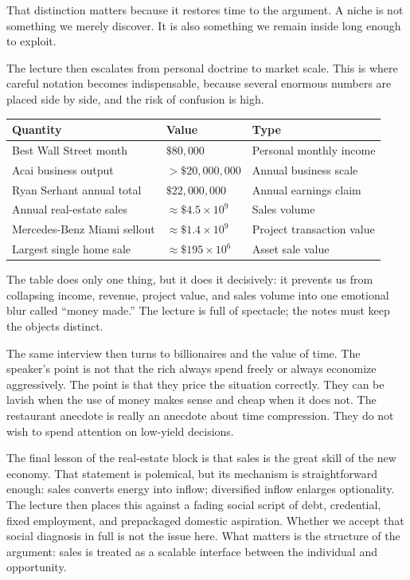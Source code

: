 That distinction matters because it restores time to the argument. A niche is not something we merely discover. It is also something we remain inside long enough to exploit.

The lecture then escalates from personal doctrine to market scale. This is where careful notation becomes indispensable, because several enormous numbers are placed side by side, and the risk of confusion is high.

\begin{table}
\centering
\begin{tabular}{|l|l|l|}
\hline
Quantity & Value & Type \\
\hline
Best Wall Street month & \(\$80{,}000\) & Personal monthly income \\
Acai business output & \(> \$20{,}000{,}000\) & Annual business scale \\
Ryan Serhant annual total & \(\$22{,}000{,}000\) & Annual earnings claim \\
Annual real-estate sales & \(\approx \$4.5 \times 10^9\) & Sales volume \\
Mercedes-Benz Miami sellout & \(\approx \$1.4 \times 10^9\) & Project transaction value \\
Largest single home sale & \(\approx \$195 \times 10^6\) & Asset sale value \\
\hline
\end{tabular}
\end{table}

The table does only one thing, but it does it decisively: it prevents us from collapsing income, revenue, project value, and sales volume into one emotional blur called ``money made.'' The lecture is full of spectacle; the notes must keep the objects distinct.

The same interview then turns to billionaires and the value of time. The speaker's point is not that the rich always spend freely or always economize aggressively. The point is that they price the situation correctly. They can be lavish when the use of money makes sense and cheap when it does not. The restaurant anecdote is really an anecdote about time compression. They do not wish to spend attention on low-yield decisions.

The final lesson of the real-estate block is that sales is the great skill of the new economy. That statement is polemical, but its mechanism is straightforward enough: sales converts energy into inflow; diversified inflow enlarges optionality. The lecture then places this against a fading social script of debt, credential, fixed employment, and prepackaged domestic aspiration. Whether we accept that social diagnosis in full is not the issue here. What matters is the structure of the argument: sales is treated as a scalable interface between the individual and opportunity.

